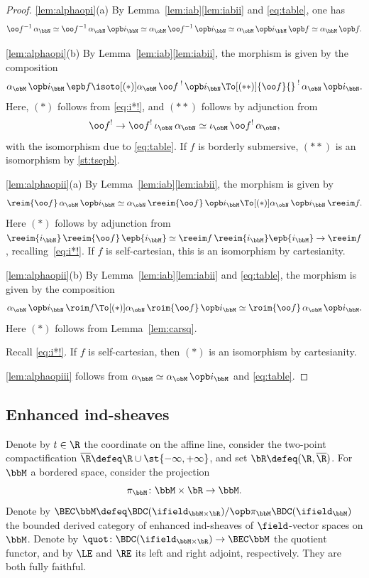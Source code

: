\skpt
\begin{proof}

\eqref{lem:alphaopi}(a)
By Lemma~\ref{lem:iab}\eqref{lem:iabii} and \eqref{eq:table}, one has
\[
\oo f{}^{-1} \, \alpha_{\bbN} \simeq \oo f{}^{-1} \, \alpha_{\obN}\,\opb i_{\bbN} \simeq \alpha_{\obM} \,\oo f{}^{-1} \,\opb i_{\bbN} \simeq \alpha_{\obM}\, \opb i_{\bbM} \,\opb f \simeq \alpha_{\bbM} \, \opb f.
\]


\eqref{lem:alphaopi}(b)
By Lemma~\ref{lem:iab}\eqref{lem:iabii}, the morphism is given by the composition
\[
\alpha_\obM \,\opb i_\bbM \,\epb f \isoto[(*)]
\alpha_\obM \, {\oo f}{}^{\;!} \, \opb i_\bbN \To[(**)] {\oo f}{}^{\;!}\, \alpha_\obN \,\opb i_\bbN.
\]
Here, $(*)$ follows from \eqref{eq:i*!}, and
$(**)$ follows by adjunction from
\[
\oo f{}^! \to \oo f{}^! \,\iota_\obN \,\alpha_\obN \simeq \iota_\obM \,\oo f{}^! \,\alpha_\obN,
\]
with the isomorphism due to \eqref{eq:table}. If $f$ is borderly submersive, $(**)$ is an isomorphism by \eqref{st:tsepb}.

\eqref{lem:alphaopii}(a)
By Lemma~\ref{lem:iab}\eqref{lem:iabii}, the morphism is given by
\[
\reim{\oo f}\,\alpha_\obM \,\opb i_\bbM \simeq \alpha_\obN \,\reeim{\oo f}\, \opb i_\bbM \To[(*)] \alpha_\obN \,\opb i_\bbN \,\reeim f.
\]
Here $(*)$ follows by adjunction from $\reeim{{i_\bbN}} \, \reeim{\oo f}\, \epb{i_\bbM} \simeq \reeim f\, \reeim{{i_\bbM}} \epb{i_\bbM} \to \reeim f$, recalling~\eqref{eq:i*!}. If $f$ is self-cartesian, this is an isomorphism by cartesianity.

\eqref{lem:alphaopii}(b) By Lemma~\ref{lem:iab}\eqref{lem:iabii} and \eqref{eq:table}, the morphism is given by the composition
\[
\alpha_\obN \,\opb i_\bbN \,\roim f \To[(*)] \alpha_\obN\, \roim{\oo f}\, \opb i_\bbM \simeq \roim{\oo f}\,\alpha_\obM \,\opb i_\bbM.
\]
Here $(*)$ follows from Lemma~\ref{lem:carsq}.

Recall \eqref{eq:i*!}. If $f$ is self-cartesian, then $(*)$ is an isomorphism by cartesianity.

\eqref{lem:alphaopiii} follows from $\alpha_\bbM \simeq \alpha_\obM \, \opb i_\bbM$ and \eqref{eq:table}.
\end{proof}

\subsection{Enhanced ind-sheaves}
Denote by $t\in\R$ the coordinate on the affine line, consider the two-point compactification $\overline\R\defeq \R\cup\st{-\infty,+\infty}$, and set $\bR\defeq(\R,\overline\R)$.
For $\bbM$ a bordered space, consider the projection
\[
\pi_\bbM\colon \bbM\times\bR\to \bbM.
\]
Denote by $\BEC \bbM\defeq\BDC(\ifield_{\bbM\times\bR})/\opb\pi_\bbM\BDC(\ifield_\bbM)$ the bounded derived category of enhanced ind-sheaves of $\field$-vector spaces on $\bbM$. Denote by $\quot\colon\BDC(\ifield_{\bbM\times\bR})\to\BEC\bbM$ the quotient functor,
and by $\LE$ and $\RE$ its left and right adjoint, respectively.
They are both fully faithful.


